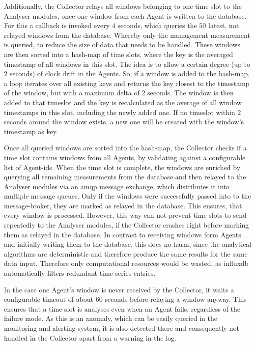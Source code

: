 Additionally, the Collector relays all windows belonging to one time slot to the Analyser modules, once one window from each Agent is written to the database.
For this a callback is invoked every $4$ seconds, which queries the $50$ latest, not relayed windows from the database. Whereby only the management measurement is queried, to reduce the size of data that needs to be handled.
These windows are then sorted into a hash-map of time slots, where the key is the averaged timestamp of all windows in this slot. The idea is to allow a certain degree (up to $2$ seconds) of clock drift in the Agents. 
So, if a window is added to the hash-map, a loop iterates over all existing keys and returns the key closest to the timestamp of the window, but with a maximum delta of $2$ seconds.
The window is then added to that timeslot and the key is recalculated as the average of all window timestamps in this slot, including the newly added one.
If no timeslot within $2$ seconds around the window exists, a new one will be created with the window's timestamp as key.

Once all queried windows are sorted into the hash-map, the Collector checks if a time slot contains windows from all Agents, by validating against a configurable list of Agent-ids.
When the time slot is complete, the windows are enriched by querying all remaining measurements from the database and then relayed to the Analyser modules via an \gls{amqp} message exchange, which distributes it into multiple message queues.
Only if the windows were successfully passed into to the message-broker, they are marked as relayed in the database. This ensures, that every window is processed. However, this way can not prevent time slots to send repeatedly to the Analyser modules, if the Collector crashes right before marking them as relayed in the database. In contrast to receiving windows form Agents and initially writing them to the database, this does no harm, since the analytical algorithms are deterministic and therefore produce the same results for the same data input. Therefore only computational resources would be wasted, as \gls{influxdb} automatically filters redundant time series entries.

In the case one Agent's window is never received by the Collector, it waits a configurable timeout of about 60 seconds before relaying a window anyway. This ensures that a time slot is analyses even when an Agent fails, regardless of the failure mode. As this is an anomaly, which can be easily queried in the monitoring and alerting system, it is also detected there and consequently not handled in the Collector apart from a warning in the log.


